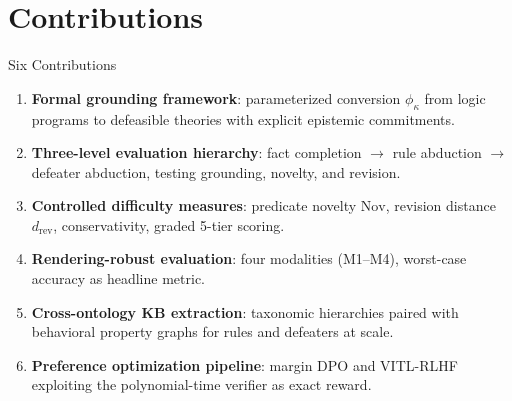 \documentclass[aspectratio=169]{beamer}
\newcommand{\partfunc}{\kappa}
\newcommand{\Nov}{\mathrm{Nov}}
\begin{document}
\section{Contributions}

\begin{frame}{Six Contributions}

\small
\begin{enumerate}\setlength\itemsep{4pt}
    \item \textbf{Formal grounding framework}: parameterized conversion $\phi_\partfunc$ from logic programs to defeasible theories with explicit epistemic commitments.

    \item \textbf{Three-level evaluation hierarchy}: fact completion $\to$ rule abduction $\to$ defeater abduction, testing grounding, novelty, and revision.

    \item \textbf{Controlled difficulty measures}: predicate novelty $\Nov$, revision distance $d_{\mathrm{rev}}$, conservativity, graded 5-tier scoring.

    \item \textbf{Rendering-robust evaluation}: four modalities (M1--M4), worst-case accuracy as headline metric.

    \item \textbf{Cross-ontology KB extraction}: taxonomic hierarchies paired with behavioral property graphs for rules and defeaters at scale.

    \item \textbf{Preference optimization pipeline}: margin DPO and VITL-RLHF exploiting the polynomial-time verifier as exact reward.
\end{enumerate}
\end{frame}
\end{document}
